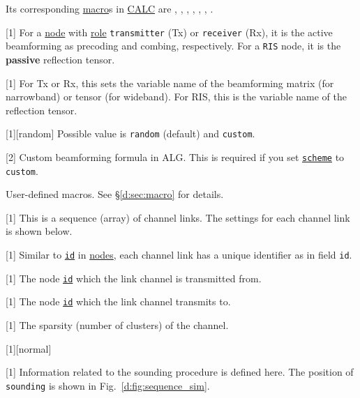 Its corresponding \hyperref[d:sec:macro]{macro}s in \hyperref[d:sec:calc]{CALC} are
, , ,
, , , .

[1]
For a \hyperref[d:subsec:sim_config_nodes]{node} with \hyperref[d:subsubsec:sim_config_nodes_role]{role}
\texttt{transmitter} (Tx) or \texttt{receiver} (Rx), it is the active beamforming as precoding and combing, respectively.
For a \texttt{RIS} node, it is the \textbf{passive} reflection tensor.

[1]
For Tx or Rx, this sets the variable name of the beamforming matrix (for narrowband) or tensor (for wideband).
For RIS, this is the variable name of the reflection tensor.

[1][random]
Possible value is \texttt{random} (default) and \texttt{custom}.

[2]
Custom beamforming formula in ALG.
This is required if you set \hyperref[d:par:sim_config_nodes_beamforming_scheme]{\texttt{scheme}} to \texttt{custom}.

User-defined macros.
See \S\ref{d:sec:macro} for details.

[1]
This is a sequence (array) of channel links.
The settings for each channel link is shown below.

[1]
Similar to \hyperref[d:subsubsec:sim_config_nodes_id]{\texttt{id}} in \hyperref[d:subsec:sim_config_nodes]{nodes},
each channel link has a unique identifier as in field \texttt{id}.

[1]
The node \hyperref[d:subsubsec:sim_config_nodes_id]{\texttt{id}} which the link channel is transmitted from.

[1]
The node \hyperref[d:subsubsec:sim_config_nodes_id]{\texttt{id}} which the link channel transmits to.

[1]
The sparsity (number of clusters) of the channel.

[1][normal]

[1]
Information related to the sounding procedure is defined here.
The position of \texttt{sounding} is shown in Fig.~\ref{d:fig:sequence_sim}.

